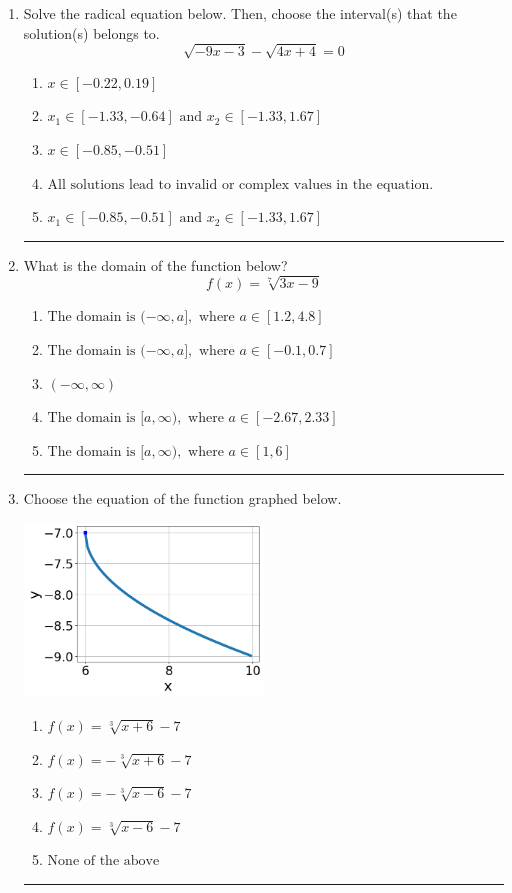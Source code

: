 \documentclass[14pt]{extbook}
\newcommand{\litem}[1]{\item#1\hspace*{-1cm}\rule{\textwidth}{0.4pt}}
\begin{document}
\begin{enumerate}
{\begin{enumerate}[label=\Alph*.]
\end{enumerate} }
\litem{
Solve the radical equation below. Then, choose the interval(s) that the solution(s) belongs to.\[ \sqrt{-9 x - 3} - \sqrt{4 x + 4} = 0 \]\begin{enumerate}[label=\Alph*.]
\item \( x \in [-0.22,0.19] \)
\item \( x_1 \in [-1.33, -0.64] \text{ and } x_2 \in [-1.33,1.67] \)
\item \( x \in [-0.85,-0.51] \)
\item \( \text{All solutions lead to invalid or complex values in the equation.} \)
\item \( x_1 \in [-0.85, -0.51] \text{ and } x_2 \in [-1.33,1.67] \)

\end{enumerate} }
\litem{
What is the domain of the function below?\[ f(x) = \sqrt[7]{3 x - 9} \]\begin{enumerate}[label=\Alph*.]
\item \( \text{The domain is } (-\infty, a], \text{   where } a \in [1.2, 4.8] \)
\item \( \text{The domain is } (-\infty, a], \text{   where } a \in [-0.1, 0.7] \)
\item \( (-\infty, \infty) \)
\item \( \text{The domain is } [a, \infty), \text{   where } a \in [-2.67, 2.33] \)
\item \( \text{The domain is } [a, \infty), \text{   where } a \in [1, 6] \)

\end{enumerate} }
\litem{
Choose the equation of the function graphed below.
\begin{center}
    \includegraphics[width=0.5\textwidth]{../Figures/radicalGraphToEquationCopyA.png}
\end{center}
\begin{enumerate}[label=\Alph*.]
\item \( f(x) = \sqrt[3]{x + 6} - 7 \)
\item \( f(x) = - \sqrt[3]{x + 6} - 7 \)
\item \( f(x) = - \sqrt[3]{x - 6} - 7 \)
\item \( f(x) = \sqrt[3]{x - 6} - 7 \)
\item \( \text{None of the above} \)


\end{enumerate}}
\end{enumerate}
\end{document}
